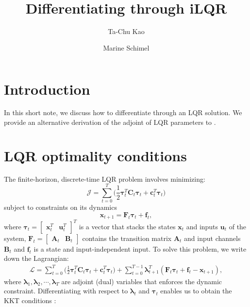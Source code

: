 \documentclass[a4paper,11pt]{article}
\title{Differentiating through iLQR}
\author{Ta-Chu Kao \and Marine Schimel}
\renewcommand\b\bm
\newcommand\x{\b{x}}
\begin{document}
\maketitle
\section{Introduction}

In this short note, we discuss how to differentiate through an LQR solution.
We provide an alternative derivation of the adjoint of LQR parameters to \citep{amos2018differentiable}.

\section{LQR optimality conditions}
%
The finite-horizon, discrete-time LQR problem involves minimizing:
%
\begin{equation}
\label{eq:eq1}
    \mathcal{J} = \sum_{t=0}^{T} \big (\frac{1}{2} \bm{\tau}_t^T \b{C}_t \bm{\tau}_t + \b{c}_t^T \b{\tau}_t \big )
\end{equation}
%
subject to constraints on its dynamics
%
\begin{equation}
    \b{x}_{t+1}=\b{F}_t \b{\tau}_t + \b{f}_t,
\end{equation}
%
where $\bm{\tau}_t = \begin{bmatrix}\x_t^T & \b{u}_t^T\end{bmatrix}^T$
is a vector that stacks the states $\x_t$ and inputs $\bm{u}_t$ of the system, $\b{F}_t = \begin{bmatrix} \b{A}_t & \b{B}_t \end{bmatrix}$ contains the transition matrix $\b{A}_t$ and input channels $\b{B}_t$ and $\b{f}_t$ is a state and input-independent input.
To solve this problem, we write down the Lagrangian:
%
\begin{equation}
    \begin{split}
        \mathcal{L}=\sum_{t=0}^{T}
        \big (
        \frac{1}{2} \b{\tau}_t^{T} \b{C}_t \b{\tau}_t + \b{c}_t^T \b{\tau}_t
        \big )
        + \sum_{t=0}^{T-1}\b{\lambda}^T_{t+1}(\b{F}_t \b{\tau}_t + \b{f}_t - \b{x}_{t+1}),
    \end{split}
\end{equation}
%
where $\b{\lambda}_1, \b{\lambda}_2, \cdots, \b{\lambda}_{T}$ are adjoint (dual) variables that enforces the dynamic constraint.
Differentiating with respect to $\b{\lambda}_t$ and $\b{\tau}_t$ enables us to obtain the KKT conditions :
%
\end{document}
